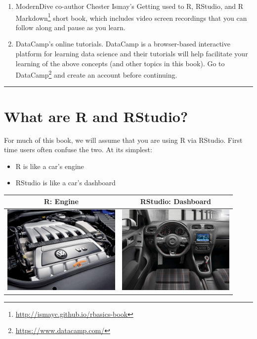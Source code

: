 \documentclass[12pt,]{krantz}
\providecommand{\tightlist}{%
  \setlength{\itemsep}{0pt}\setlength{\parskip}{0pt}}
\renewcommand{\href}[2]{#2\footnote{\url{#1}}}
\theoremstyle{definition}
\theoremstyle{definition}
\theoremstyle{definition}
\theoremstyle{remark}
\begin{document}
\begin{enumerate}
\def\labelenumi{\arabic{enumi}.}
\tightlist
\item
  ModernDive co-author Chester Ismay's
  \href{http://ismayc.github.io/rbasics-book}{Getting used to R,
  RStudio, and R Markdown} \citep{usedtor2016} short book, which
  includes video screen recordings that you can follow along and pause
  as you learn.
\item
  DataCamp's online tutorials. DataCamp is a browser-based interactive
  platform for learning data science and their tutorials will help
  facilitate your learning of the above concepts (and other topics in
  this book). Go to \href{https://www.datacamp.com/}{DataCamp} and
  create an account before continuing.
\end{enumerate}

\begin{center}\rule{0.5\linewidth}{\linethickness}\end{center}

\section{What are R and RStudio?}\label{what-are-r-and-rstudio}

For much of this book, we will assume that you are using R via RStudio.
First time users often confuse the two. At its simplest:

\begin{itemize}
\tightlist
\item
  R is like a car's engine
\item
  RStudio is like a car's dashboard
\end{itemize}

\begin{longtable}[]{@{}cc@{}}
\toprule
R: Engine & RStudio: Dashboard\tabularnewline
\midrule
\endhead
\includegraphics[height=1.70000in]{images/engine.jpg} &
\includegraphics[height=1.70000in]{images/dashboard.jpg}\tabularnewline
\bottomrule
\end{longtable}
\end{document}
